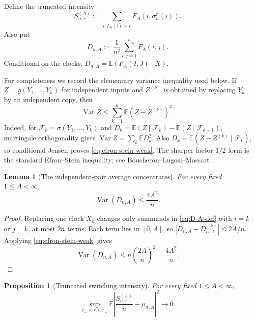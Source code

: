 \documentclass[11pt]{article}
\newcommand{\E}{\mathbb E}
\newcommand{\1}{\mathbf 1}
\newcommand{\Var}{\operatorname{Var}}
\newcommand{\cF}{\mathcal F}
\newtheorem{proposition}[theorem]{Proposition}
\newtheorem{lemma}[theorem]{Lemma}
\theoremstyle{definition}
\theoremstyle{remark}
\begin{document}
Define the truncated intensity
\begin{equation}\label{eq:S-A-def}
  S_{n,r}^{(A)}
  :=\sum_{i:L_n(i)>r}F_A(i,\sigma_n^r(i)).
\end{equation}
Also put
\begin{equation}\label{eq:D-A-def}
  D_{n,A}:=\frac1{n^2}\sum_{i,j=1}^nF_A(i,j).
\end{equation}
Conditional on the clocks,
$D_{n,A}=\E(F_A(I,J)\mid X)$.

For completeness we record the elementary variance inequality used below.
If $Z=g(Y_1,\dots,Y_n)$ for independent inputs and $Z^{(k)}$ is obtained
by replacing $Y_k$ by an independent copy, then
\begin{equation}\label{eq:efron-stein-weak}
  \Var Z\leq\sum_{k=1}^n\E(Z-Z^{(k)})^2.
\end{equation}
Indeed, for $\cF_k=\sigma(Y_1,\dots,Y_k)$ and
$D_k=\E(Z\mid\cF_k)-\E(Z\mid\cF_{k-1})$, martingale
orthogonality gives $\Var Z=\sum_k\E D_k^2$.  Also
$D_k=\E(Z-Z^{(k)}\mid\cF_k)$, so conditional Jensen proves
\eqref{eq:efron-stein-weak}.  The sharper factor-$1/2$ form is the
standard Efron--Stein inequality; see
Boucheron--Lugosi--Massart~\cite[Theorem~3.1]{BLM2013}.

\begin{lemma}[The independent-pair average concentrates]
\label{lem:D-concentration}
For every fixed $1\leq A<\infty$,
\begin{equation}\label{eq:D-variance}
  \Var(D_{n,A})\leq\frac{4A^2}{n}.
\end{equation}
\end{lemma}

\begin{proof}
Replacing one clock $X_k$ changes only summands in
\eqref{eq:D-A-def} with $i=k$ or $j=k$, at most $2n$ terms.  Each term
lies in $[0,A]$, so
$|D_{n,A}-D_{n,A}^{(k)}|\leq2A/n$.  Applying
\eqref{eq:efron-stein-weak} gives
\[
 \Var(D_{n,A})\leq n\left(\frac{2A}{n}\right)^2
 =\frac{4A^2}{n}.
\]
\end{proof}

\begin{proposition}[Truncated switching intensity]
\label{prop:truncated-intensity}
For every fixed $1\leq A<\infty$,
\begin{equation}\label{eq:truncated-L2}
 \sup_{r_-\leq r\leq r_+}
 \E\left|\frac{S_{n,r}^{(A)}}n-\mu_{n,A}\right|^2
 \longrightarrow0.
\end{equation}
\end{proposition}
\end{document}
